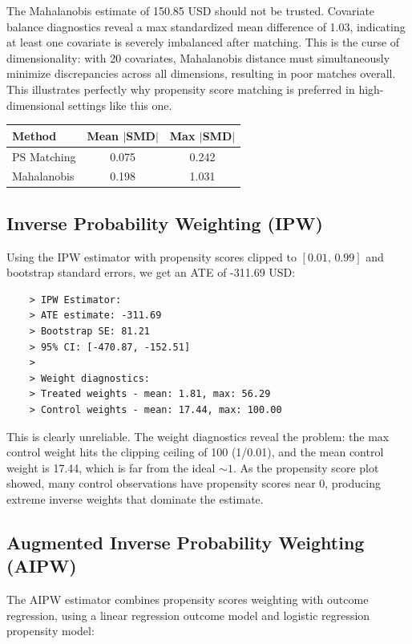 \documentclass[10pt]{article}
\begin{document}
The Mahalanobis estimate of 150.85 USD should not be trusted. Covariate balance diagnostics reveal a max standardized mean difference of 1.03, indicating at least one covariate is severely imbalanced after matching. This is the curse of dimensionality: with 20 covariates, Mahalanobis distance must simultaneously minimize discrepancies across all dimensions, resulting in poor matches overall. This illustrates perfectly why propensity score matching is preferred in high-dimensional settings like this one. 
\begin{center}
    \begin{tabular}{lcc}
        \hline
        \textbf{Method} & \textbf{Mean $|$SMD$|$} & \textbf{Max $|$SMD$|$} \\\hline
        PS Matching & 0.075 & 0.242 \\
        Mahalanobis & 0.198 & 1.031 \\\hline
    \end{tabular}
\end{center}

\subsection{Inverse Probability Weighting (IPW)}

Using the IPW estimator with propensity scores clipped to $[0.01,\, 0.99] $ and bootstrap standard errors, we get an ATE of -311.69 USD:

\begin{verbatim}
    > IPW Estimator:
    > ATE estimate: -311.69
    > Bootstrap SE: 81.21
    > 95% CI: [-470.87, -152.51]
    >
    > Weight diagnostics:
    > Treated weights - mean: 1.81, max: 56.29
    > Control weights - mean: 17.44, max: 100.00
\end{verbatim}


This is clearly unreliable. The weight diagnostics reveal the problem: the max control weight hits the clipping ceiling of 100 (1/0.01), and the mean control weight is 17.44, which is far from the ideal $\sim 1 $. As the propensity score plot showed, many control observations have propensity scores near 0, producing extreme inverse weights that dominate the estimate.

\subsection{Augmented Inverse Probability Weighting (AIPW)}

The AIPW estimator combines propensity scores weighting with outcome regression, using a linear regression outcome model and logistic regression propensity model: 
\end{document}

